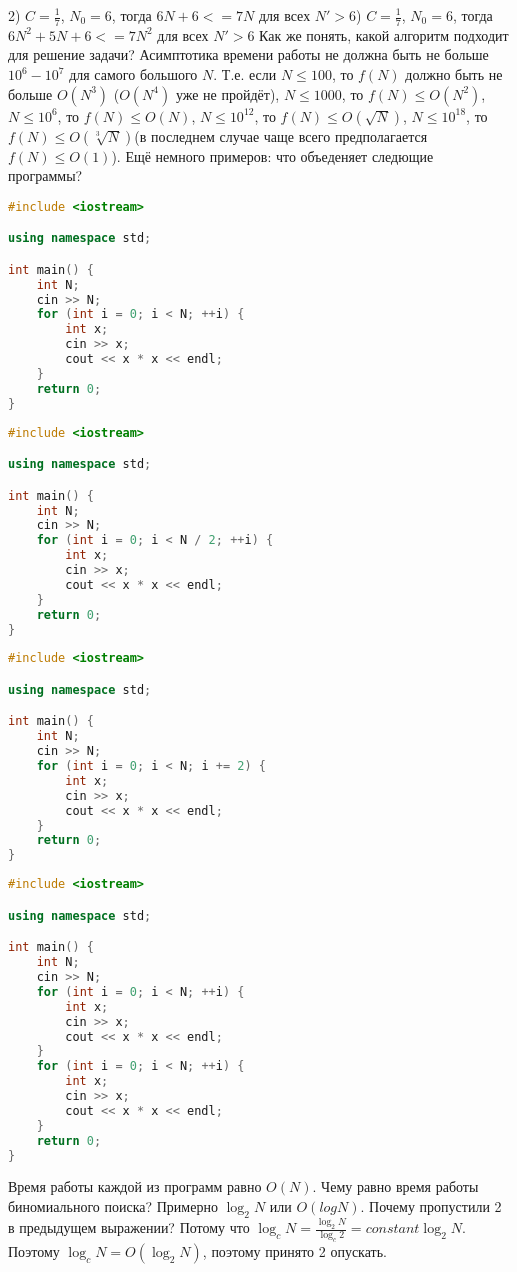 \documentclass[a4paper,12pt]{article}
\begin{document}
2) $C = \frac{1}{7}$, $N_0 = 6$, тогда $6N + 6 <= 7N$ для всех $N' > 6$) $C = \frac{1}{7}$, $N_0 = 6$, тогда $6N^2 + 5N + 6 <= 7N^2$ для всех $N' > 6$\newline
Как же понять, какой алгоритм подходит для решение задачи? Асимптотика времени работы не должна быть не больше $10^6-10^7$ для самого большого $N$.
Т.е. если $N \le 100$, то $f(N)$ должно быть не больше $O(N^3)$ ($O(N^4)$ уже не пройдёт), $N \le 1000$, то $f(N) \le O(N^2)$, $N \le 10^6$, то
$f(N) \le O(N)$, $N \le 10^{12}$, то $f(N) \le O(\sqrt{N})$, $N \le 10^{18}$, то $f(N) \le O(\sqrt[3]{N})$(в последнем случае чаще всего
предполагается $f(N) \le O(1)$).\newline
Ещё немного примеров: что объеденяет следющие программы?\newline
\begin{lstlisting}[language=C++]
#include <iostream>

using namespace std;

int main() {
    int N;
    cin >> N;
    for (int i = 0; i < N; ++i) {
        int x;
        cin >> x;
        cout << x * x << endl;
    }
    return 0;
}
\end{lstlisting}
\begin{lstlisting}[language=C++]
#include <iostream>

using namespace std;

int main() {
    int N;
    cin >> N;
    for (int i = 0; i < N / 2; ++i) {
        int x;
        cin >> x;
        cout << x * x << endl;
    }
    return 0;
}
\end{lstlisting}
\begin{lstlisting}[language=C++]
#include <iostream>

using namespace std;

int main() {
    int N;
    cin >> N;
    for (int i = 0; i < N; i += 2) {
        int x;
        cin >> x;
        cout << x * x << endl;
    }
    return 0;
}
\end{lstlisting}
\begin{lstlisting}[language=C++]
#include <iostream>

using namespace std;

int main() {
    int N;
    cin >> N;
    for (int i = 0; i < N; ++i) {
        int x;
        cin >> x;
        cout << x * x << endl;
    }
    for (int i = 0; i < N; ++i) {
        int x;
        cin >> x;
        cout << x * x << endl;
    }
    return 0;
}
\end{lstlisting}
Время работы каждой из программ равно $O(N)$.\newline
Чему равно время работы биномиального поиска? Примерно $\log_{2}N$ или $O(log N)$. Почему пропустили 2 в предыдущем выражении? Потому что
$\log_{c}N = \frac{\log_{2}N}{\log_{c}{2}} = constant\log_2{N}$. Поэтому $\log_{c}N = O(\log_2{N})$, поэтому принято 2 опускать.
\end{document}
